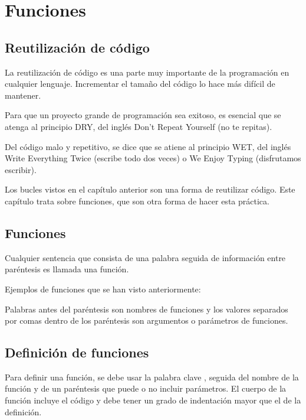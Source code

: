 \chapter{Funciones}

\section{Reutilización de código}

La reutilización de código es una parte muy importante de la programación en cualquier lenguaje.
Incrementar el tamaño del código lo hace más difícil de mantener.

Para que un proyecto grande de programación sea exitoso, es esencial que se atenga al principio DRY, del inglés Don't Repeat Yourself (no te repitas).

Del código malo y repetitivo, se dice que se atiene al principio WET, del inglés Write Everything Twice (escribe todo dos veces) o We Enjoy Typing (disfrutamos escribir).

Los bucles vistos en el capítulo anterior son una forma de reutilizar código.
Este capítulo trata sobre funciones, que son otra forma de hacer esta práctica.

\section{Funciones}

Cualquier sentencia que consista de una palabra seguida de información entre paréntesis es llamada una función.

Ejemplos de funciones que se han visto anteriormente:


Palabras antes del paréntesis son nombres de funciones y los valores separados por comas dentro de los paréntesis son argumentos o parámetros de funciones.

\section{Definición de funciones}

Para definir una función, se debe usar la palabra clave , seguida del nombre de la función y de un paréntesis que puede o no incluir parámetros.
El cuerpo de la función incluye el código y debe tener un grado de indentación mayor que el de la definición.

